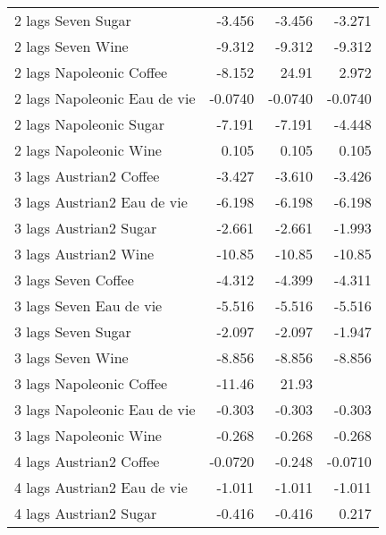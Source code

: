 {\begin{longtable}{l*{3}{D{.}{.}{-1}}}
2 lags Seven Sugar  &      -3.456\sym{***}&      -3.456\sym{***}&      -3.271\sym{***}\\
2 lags Seven Wine   &      -9.312\sym{***}&      -9.312\sym{***}&      -9.312\sym{***}\\
2 lags Napoleonic Coffee&      -8.152\sym{***}&       24.91\sym{*}  &       2.972\sym{***}\\
2 lags Napoleonic Eau de vie&     -0.0740         &     -0.0740         &     -0.0740         \\
2 lags Napoleonic Sugar&      -7.191\sym{***}&      -7.191\sym{***}&      -4.448\sym{***}\\
2 lags Napoleonic Wine&       0.105         &       0.105         &       0.105         \\
3 lags Austrian2 Coffee&      -3.427\sym{***}&      -3.610\sym{***}&      -3.426\sym{***}\\
3 lags Austrian2 Eau de vie&      -6.198\sym{***}&      -6.198\sym{***}&      -6.198\sym{***}\\
3 lags Austrian2 Sugar&      -2.661\sym{***}&      -2.661\sym{***}&      -1.993\sym{***}\\
3 lags Austrian2 Wine&      -10.85\sym{***}&      -10.85\sym{***}&      -10.85\sym{***}\\
3 lags Seven Coffee &      -4.312\sym{***}&      -4.399\sym{***}&      -4.311\sym{***}\\
3 lags Seven Eau de vie&      -5.516\sym{***}&      -5.516\sym{***}&      -5.516\sym{***}\\
3 lags Seven Sugar  &      -2.097\sym{***}&      -2.097\sym{***}&      -1.947\sym{***}\\
3 lags Seven Wine   &      -8.856\sym{***}&      -8.856\sym{***}&      -8.856\sym{***}\\
3 lags Napoleonic Coffee&      -11.46\sym{***}&       21.93         &                     \\
3 lags Napoleonic Eau de vie&      -0.303         &      -0.303         &      -0.303         \\
3 lags Napoleonic Wine&      -0.268         &      -0.268         &      -0.268         \\
4 lags Austrian2 Coffee&     -0.0720         &      -0.248         &     -0.0710         \\
4 lags Austrian2 Eau de vie&      -1.011\sym{**} &      -1.011\sym{**} &      -1.011\sym{**} \\
4 lags Austrian2 Sugar&      -0.416         &      -0.416         &       0.217         \\

\end{longtable}}

